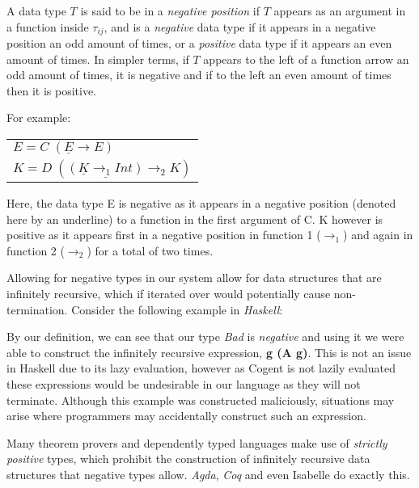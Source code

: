 A data type $T$ is said to be in a \textit{negative position} if $T$ appears as an argument in a function
inside $\tau_{ij}$, and is a \textit{negative} data type if it appears in a negative position an odd amount
of times, or a \textit{positive} data type if it appears an even amount of times.
In simpler terms, if $T$ appears to the left of a function arrow an odd amount of times, it is negative and if
to the left an even amount of times then it is positive.

For example:

\begin{center}
    \begin{tabular}{l}
        $E = C\; (\underline{E} \rightarrow E)$ \\
        $K = D\; (\underline{(\underline{K} \rightarrow_1 Int)} \rightarrow_2 K)$
    \end{tabular} 
\end{center}

Here, the data type E is negative as it appears in a negative position (denoted here by an underline)
to a function in the first argument of C.
K however is positive as it appears first in a negative position in function 1 ($\rightarrow_1$) and again
in function 2 ($\rightarrow_2$) for a total of two times.

Allowing for negative types in our system allow for data structures that are infinitely recursive,
which if iterated over would potentially cause non-termination. Consider
the following example in \textit{Haskell}:

\pagebreak


By our definition, we can see that our type \textit{Bad} is \textit{negative} and using it we were able
to construct the infinitely recursive expression, \textbf{g (A g)}.
This is not an issue in Haskell due to its lazy evaluation,
however as Cogent is not lazily evaluated these expressions would be undesirable in
our language as they will not terminate.
Although this example was constructed maliciously, situations may arise where
programmers may accidentally construct such an expression.

Many theorem provers and dependently typed languages make use of \textit{strictly positive} types, which
prohibit the construction of infinitely recursive data structures that negative types allow.  
\textit{Agda}\citep{AgdaStrictlyPositive}, \textit{Coq}\citep{CoqStrictlyPositive} and even
Isabelle\citep{IsabelleStrictlyPositive} do exactly this.

